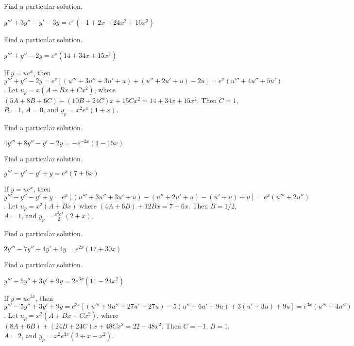 \documentclass{ximera}
\begin{document}
\begin{problem}\label{exer:9.3.5}   Find a particular solution. 

$y'''+3y''-y'-3y=e^x(-1+2x+24x^2+16x^3)$
\end{problem}

\begin{problem}\label{exer:9.3.6}   Find a particular solution.  

$y'''+y''-2y=e^x(14+34x+15x^2)$

\begin{solution}
If $y=ue^x$, then $y'''+y''-2y=e^x[
(u'''+3u''+3u'+u) +(u''+2u'+u) -2u]= e^x(u'''+4u''+5u')$. Let
$u_p=x(A+Bx+Cx^2)$, where $(5A+8B+6C) +(10B+24C)x +15Cx^2
=14+34x+15x^2$. Then $C=1$, $B=1$, $A=0$, and $y_p=x^2e^x(1+x)$.
\end{solution}
\end{problem}

\begin{problem}\label{exer:9.3.7}   Find a particular solution.   

$4y'''+8y''-y'-2y=-e^{-2x}(1-15x)$
\end{problem}

\begin{problem}\label{exer:9.3.8}   Find a particular solution.  

$y'''-y''-y'+y=e^x(7+6x)$

\begin{solution}
If $y=ue^x$, then $y'''-y''-y'+y=e^x[
(u'''+3u''+3u'+u) -(u''+2u'+u) -(u'+u) +u]= e^x(u'''+2u'')$. Let
$u_p=x^2(A+Bx)$ where $(4A+6B)+12Bx= 7+6x$. Then $B=1/2$, $A=1$, and
$y_p=\frac{x^2e^x}{2}(2+x)$.
\end{solution}
\end{problem}

\begin{problem}\label{exer:9.3.9}   Find a particular solution. 

$2y'''-7y''+4y'+4y=e^{2x}(17+30x)$
\end{problem}

\begin{problem}\label{exer:9.3.10}   Find a particular solution.

$y'''-5y''+3y'+9y=2e^{3x}(11-24x^2)$

\begin{solution}
If $y=ue^{3x}$, then $y'''-5y''+3y'+9y=e^{3x}[
(u'''+9u''+27u'+27u) -5(u''+6u'+9u) +3(u'+3u) +9u]=
e^{3x}(u'''+4u'')$.
Let $u_p=x^2(A+Bx+Cx^2)$, where $(8A+6B) +(24B+24C)x+ 48Cx^2=
22-48x^2$. Then $C=-1$, $B=1$, $A=2$, and $y_p=x^2e^{3x}(2+x-x^2)$.
\end{solution}
\end{problem}
\end{document}
